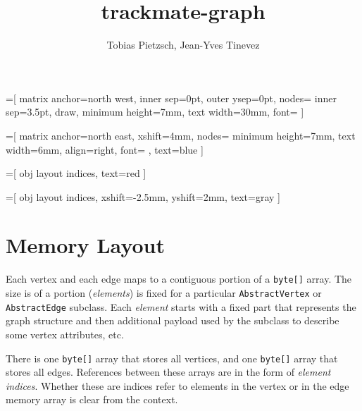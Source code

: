 \documentclass[a4paper]{article}
\begin{document}
\title{trackmate-graph}
\author{Tobias Pietzsch, Jean-Yves Tinevez}
\maketitle




=[
  	matrix anchor=north west,
		inner sep=0pt,
		outer ysep=0pt,
		nodes={
			inner sep=3.5pt,
			draw,
			minimum height=7mm,
			text width=30mm,
			font=\ttfamily
		}
	]
	
=[
  	matrix anchor=north east,
		xshift=4mm,
		nodes={
			minimum height=7mm,
			text width=6mm,
			align=right,
			font=\ttfamily
		},
		text=blue
	]
	
=[
		obj layout indices,
		text=red
	]
	
=[
		obj layout indices,
		xshift=-2.5mm,
		yshift=2mm,
		text=gray
	]


\section{Memory Layout}

Each vertex and each edge maps to a contiguous portion of a \texttt{byte[]} array.
The size is of a portion (\emph{elements}) is fixed for a particular \texttt{AbstractVertex} or \texttt{AbstractEdge} subclass.
Each \emph{element} starts with a fixed part that represents the graph structure and then
	additional payload used by the subclass to describe some vertex attributes, etc.
 
There is one \texttt{byte[]} array that stores all vertices,
	and one \texttt{byte[]} array that stores all edges.
References between these arrays are in the form of \emph{element indices}.
Whether these are indices refer to elements in the vertex or in the edge memory array is clear from the context.
\end{document}
